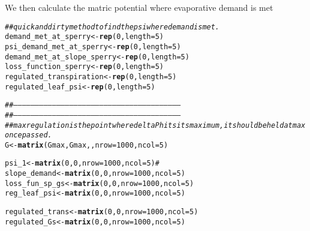 \documentclass[a4paper]{article}\usepackage[]{graphicx}\usepackage[]{color}
\makeatletter
\newcommand{\hlnum}[1]{\textcolor[rgb]{0.686,0.059,0.569}{#1}}%
\newcommand{\hlcom}[1]{\textcolor[rgb]{0.678,0.584,0.686}{\textit{#1}}}%
\newcommand{\hlstd}[1]{\textcolor[rgb]{0.345,0.345,0.345}{#1}}%
\newcommand{\hlkwb}[1]{\textcolor[rgb]{0.69,0.353,0.396}{#1}}%
\newcommand{\hlkwc}[1]{\textcolor[rgb]{0.333,0.667,0.333}{#1}}%
\newcommand{\hlkwd}[1]{\textcolor[rgb]{0.737,0.353,0.396}{\textbf{#1}}}%
\newenvironment{kframe}{%
 \def\at@end@of@kframe{}%
 \ifinner\ifhmode%
  \def\at@end@of@kframe{\end{minipage}}%
  \begin{minipage}{\columnwidth}%
 \fi\fi%
 \def\FrameCommand##1{\hskip\@totalleftmargin \hskip-\fboxsep
 \colorbox{shadecolor}{##1}\hskip-\fboxsep
     \hskip-\linewidth \hskip-\@totalleftmargin \hskip\columnwidth}%
 \MakeFramed {\advance\hsize-\width
   \@totalleftmargin\z@ \linewidth\hsize
   \@setminipage}}%
 {\par\unskip\endMakeFramed%
 \at@end@of@kframe}
\newenvironment{knitrout}{}{} %
\makeatother
\begin{document}
We then calculate the matric potential where evaporative demand is met
\begin{knitrout}
\color{fgcolor}\begin{kframe}
\begin{alltt}
\hlcom{## quick and dirty method to find the psi where demand is met. }
\hlstd{demand_met_at_sperry} \hlkwb{<-} \hlkwd{rep}\hlstd{(}\hlnum{0}\hlstd{,} \hlkwc{length}\hlstd{=}\hlnum{5}\hlstd{)}
\hlstd{psi_demand_met_at_sperry} \hlkwb{<-} \hlkwd{rep}\hlstd{(}\hlnum{0}\hlstd{,} \hlkwc{length}\hlstd{=}\hlnum{5}\hlstd{)}
\hlstd{demand_met_at_slope_sperry} \hlkwb{<-} \hlkwd{rep}\hlstd{(}\hlnum{0}\hlstd{,} \hlkwc{length}\hlstd{=}\hlnum{5}\hlstd{)}
\hlstd{loss_function_sperry} \hlkwb{<-} \hlkwd{rep}\hlstd{(}\hlnum{0}\hlstd{,} \hlkwc{length}\hlstd{=}\hlnum{5}\hlstd{)}
\hlstd{regulated_transpiration} \hlkwb{<-} \hlkwd{rep}\hlstd{(}\hlnum{0}\hlstd{,} \hlkwc{length}\hlstd{=}\hlnum{5}\hlstd{)}
\hlstd{regulated_leaf_psi} \hlkwb{<-} \hlkwd{rep}\hlstd{(}\hlnum{0}\hlstd{,} \hlkwc{length}\hlstd{=}\hlnum{5}\hlstd{)}

\hlcom{##---------------------------------------------------------------------------------------------------------------------}
\hlcom{##---------------------------------------------------------------------------------------------------------------------}
\hlcom{## max regulation is the point where delta P hits its maximum, it should be held at max once passed.}
\hlstd{G} \hlkwb{<-} \hlkwd{matrix}\hlstd{(Gmax, Gmax, ,}\hlkwc{nrow}\hlstd{=}\hlnum{1000}\hlstd{,} \hlkwc{ncol}\hlstd{=}\hlnum{5}\hlstd{)}

\hlstd{psi_1} \hlkwb{<-} \hlkwd{matrix}\hlstd{(}\hlnum{0}\hlstd{,}\hlnum{0}\hlstd{,}\hlkwc{nrow}\hlstd{=}\hlnum{1000}\hlstd{,} \hlkwc{ncol}\hlstd{=}\hlnum{5}\hlstd{)}\hlcom{#}
\hlstd{slope_demand} \hlkwb{<-} \hlkwd{matrix}\hlstd{(}\hlnum{0}\hlstd{,}\hlnum{0}\hlstd{,}\hlkwc{nrow}\hlstd{=}\hlnum{1000}\hlstd{,} \hlkwc{ncol}\hlstd{=}\hlnum{5}\hlstd{)}
\hlstd{loss_fun_sp_gs} \hlkwb{<-} \hlkwd{matrix}\hlstd{(}\hlnum{0}\hlstd{,}\hlnum{0}\hlstd{,}\hlkwc{nrow}\hlstd{=}\hlnum{1000}\hlstd{,} \hlkwc{ncol}\hlstd{=}\hlnum{5}\hlstd{)}
\hlstd{reg_leaf_psi} \hlkwb{<-} \hlkwd{matrix}\hlstd{(}\hlnum{0}\hlstd{,}\hlnum{0}\hlstd{,}\hlkwc{nrow}\hlstd{=}\hlnum{1000}\hlstd{,} \hlkwc{ncol}\hlstd{=}\hlnum{5}\hlstd{)}

\hlstd{regulated_trans} \hlkwb{<-} \hlkwd{matrix}\hlstd{(}\hlnum{0}\hlstd{,}\hlnum{0}\hlstd{,}\hlkwc{nrow}\hlstd{=}\hlnum{1000}\hlstd{,} \hlkwc{ncol}\hlstd{=}\hlnum{5}\hlstd{)}
\hlstd{regulated_Gs} \hlkwb{<-} \hlkwd{matrix}\hlstd{(}\hlnum{0}\hlstd{,}\hlnum{0}\hlstd{,}\hlkwc{nrow}\hlstd{=}\hlnum{1000}\hlstd{,} \hlkwc{ncol}\hlstd{=}\hlnum{5}\hlstd{)}


\end{alltt}
\end{kframe}
\end{knitrout}
\end{document}

